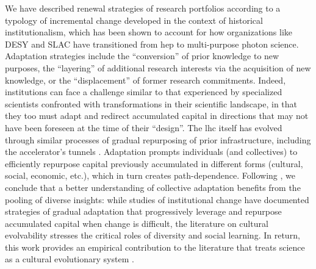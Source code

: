 \documentclass{article}
\begin{document}
We have described renewal strategies of research portfolios according to a typology of incremental change developed in the context of historical institutionalism, which has been shown to account for how organizations like DESY and SLAC have transitioned from \gls{hep} to multi-purpose photon science. Adaptation strategies include the ``conversion'' of prior knowledge to new purposes, the ``layering'' of additional research interests via the acquisition of new knowledge, or the ``displacement'' of former research commitments. Indeed, institutions can face a challenge similar to that experienced by specialized scientists confronted with transformations in their scientific landscape, in that they too must adapt and redirect accumulated capital in directions that may not have been foreseen at the time of their ``design''. The \gls{lhc} itself has evolved through similar processes of gradual repurposing of prior infrastructure, including the accelerator's tunnels \citep{Smith2015}. Adaptation prompts individuals (and collectives) to efficiently repurpose capital previously accumulated in different forms (cultural, social, economic, etc.), which in turn creates path-dependence. Following \citealt{Galesic2023}, we conclude that a better understanding of collective adaptation benefits from the pooling of diverse insights: while studies of institutional change have documented strategies of gradual adaptation that progressively leverage and repurpose accumulated capital when change is difficult, the literature on cultural evolvability stresses the critical roles of diversity and social learning. In return, this work provides an empirical contribution to the literature that treats science as a cultural evolutionary system \citep{Wu2023}.


\end{document}
